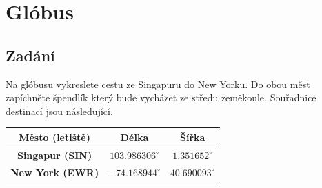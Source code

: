 \documentclass{article}
\begin{document}
	
	\tableofcontents
	\newpage
	\section{Glóbus}
		\subsection{Zadání}
			Na glóbusu vykreslete cestu ze Singapuru do New Yorku. Do obou měst zapíchněte špendlík který bude vycházet ze středu zeměkoule. Souřadnice destinací jsou následující. 
			\begin{table}[H]
				\begin{tabular}{|c|c|c|}
					\hline
					Město (letiště) & Délka & Šířka \\
					\hline
					\textbf{Singapur (SIN)} &  \(103.986306^{\circ}\) & \(1.351652^{\circ}\) \\
					\hline
					\textbf{New York (EWR)} & \(-74.168944^{\circ}\) & \(40.690093^{\circ}\) \\
					\hline
				\end{tabular}
				\label{tab:1:souradnice}
				\centering
			\end{table}
\end{document}
